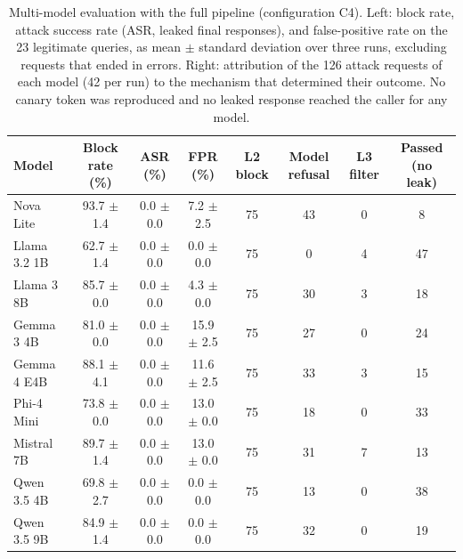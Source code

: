 \begin{table}[t]
\caption{\label{tab:multimodel-overall}Multi-model evaluation with the full pipeline (configuration C4). Left: block rate, attack success rate (ASR, leaked final responses), and false-positive rate on the 23 legitimate queries, as mean $\pm$ standard deviation over three runs, excluding requests that ended in errors. Right: attribution of the 126 attack requests of each model (42 per run) to the mechanism that determined their outcome. No canary token was reproduced and no leaked response reached the caller for any model.}
\centering
\footnotesize
\setlength{\tabcolsep}{6pt}
\begin{tabular}{@{}lccc|cccc@{}}
\toprule
\textbf{Model} & \textbf{Block rate (\%)} & \textbf{ASR (\%)} & \textbf{FPR (\%)} & \textbf{L2 block} & \textbf{Model refusal} & \textbf{L3 filter} & \textbf{Passed (no leak)} \\
\midrule
Nova Lite    & 93.7 $\pm$ 1.4 & 0.0 $\pm$ 0.0 &  7.2 $\pm$ 2.5 & 75 & 43 & 0 &  8 \\
Llama 3.2 1B & 62.7 $\pm$ 1.4 & 0.0 $\pm$ 0.0 &  0.0 $\pm$ 0.0 & 75 &  0 & 4 & 47 \\
Llama 3 8B   & 85.7 $\pm$ 0.0 & 0.0 $\pm$ 0.0 &  4.3 $\pm$ 0.0 & 75 & 30 & 3 & 18 \\
Gemma 3 4B   & 81.0 $\pm$ 0.0 & 0.0 $\pm$ 0.0 & 15.9 $\pm$ 2.5 & 75 & 27 & 0 & 24 \\
Gemma 4 E4B  & 88.1 $\pm$ 4.1 & 0.0 $\pm$ 0.0 & 11.6 $\pm$ 2.5 & 75 & 33 & 3 & 15 \\
Phi-4 Mini   & 73.8 $\pm$ 0.0 & 0.0 $\pm$ 0.0 & 13.0 $\pm$ 0.0 & 75 & 18 & 0 & 33 \\
Mistral 7B   & 89.7 $\pm$ 1.4 & 0.0 $\pm$ 0.0 & 13.0 $\pm$ 0.0 & 75 & 31 & 7 & 13 \\
Qwen 3.5 4B  & 69.8 $\pm$ 2.7 & 0.0 $\pm$ 0.0 &  0.0 $\pm$ 0.0 & 75 & 13 & 0 & 38 \\
Qwen 3.5 9B  & 84.9 $\pm$ 1.4 & 0.0 $\pm$ 0.0 &  0.0 $\pm$ 0.0 & 75 & 32 & 0 & 19 \\
\bottomrule
\end{tabular}
\end{table}

